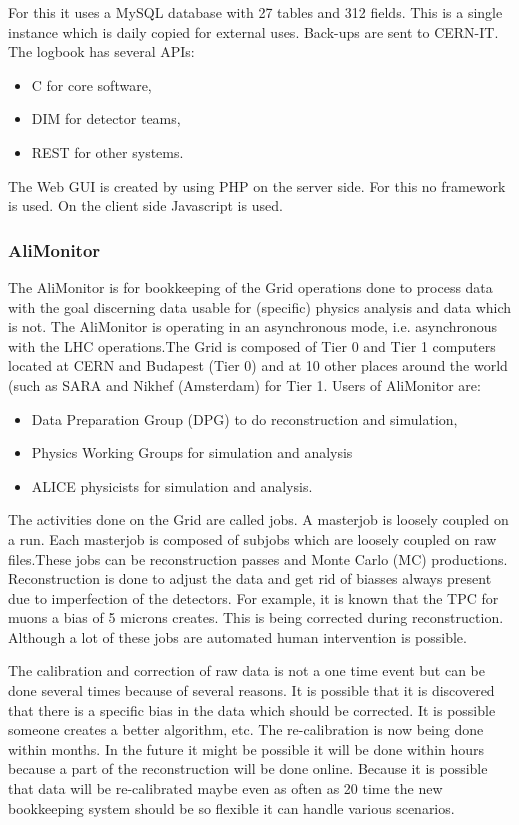 For this it uses a MySQL database with 27 tables and 312 fields. This is a single instance which is daily copied for external uses. Back-ups are sent to CERN-IT. The logbook has several APIs:
\begin{itemize}
  \item C for core software,
  \item DIM for detector teams,
  \item REST for other systems.
\end{itemize}
The Web GUI is created by using PHP on the server side. For this no framework is used. On the client side Javascript is used.


\subsubsection{AliMonitor}

The AliMonitor is for bookkeeping of the Grid operations done to process data with the goal discerning data usable for (specific) physics analysis and data which is not. The AliMonitor is operating in an asynchronous mode, i.e. asynchronous with the LHC operations.The Grid is composed of Tier 0 and Tier 1 computers located at CERN and Budapest (Tier 0) and at 10 other places around the world (such as SARA and Nikhef (Amsterdam) for Tier 1. Users of AliMonitor are:
\begin{itemize}
  \item Data Preparation Group (DPG) to do reconstruction and simulation,
  \item Physics Working Groups for simulation and analysis
  \item ALICE physicists for simulation and analysis.
\end{itemize}
The activities done on the Grid are called jobs. A masterjob is loosely coupled on a run. Each masterjob is composed of subjobs which are loosely coupled on raw files.These jobs can be reconstruction passes and Monte Carlo (MC) productions. Reconstruction is done to adjust the data and get rid of biasses always present due to imperfection of the detectors. For example, it is known that the TPC for muons a bias of 5 microns creates. This is being corrected during reconstruction. Although a lot of these jobs are automated human intervention is possible.

The calibration and correction of raw data is not a one time event but can be done several times because of several reasons. It is possible that it is discovered that there is a specific bias in the data which should be corrected. It is possible someone creates a better algorithm, etc. The re-calibration is now being done within months. In the future it might be possible it will be done within hours because a part of the reconstruction will be done online. Because it is possible that data will be re-calibrated maybe even as often as 20 time the new bookkeeping system should be so flexible it can handle various scenarios.

